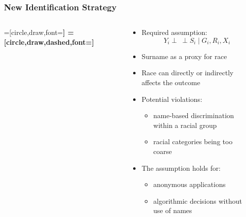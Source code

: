 \documentclass{beamer}
\newcommand{\indep}{\mathbin{\perp\!\!\!\!\!\:\perp}}
\begin{document}
\begin{frame}

\frametitle{New Identification Strategy}


  \begin{columns}
    \begin{column}{0.35\textwidth}
      =[circle,draw,font=\sffamily\Large\bfseries]
      =[circle,draw,dashed,font=\sffamily\Large\bfseries]
  \end{column}
   \begin{column}{0.65\textwidth}
      \begin{itemize}
        \item<2-> Required assumption: $$Y_i \indep S_i \mid G_i, R_i, X_i$$

        \item Surname as a proxy for race
        \item Race can directly or indirectly affects the outcome

          \bigskip
        \item Potential violations:
          \begin{itemize}
          \item name-based discrimination within a racial group
          \item racial categories being too coarse
         \end{itemize}
       \item The assumption holds for:
         \begin{itemize}
         \item anonymous applications
         \item algorithmic decisions without use of names
         \end{itemize}
      \end{itemize}
    \end{column}
  \end{columns}
  
\end{frame}
\end{document}

